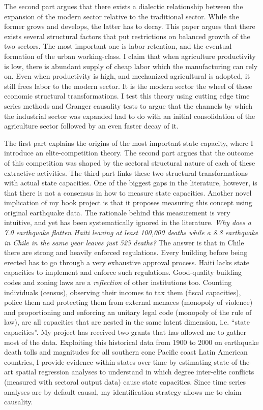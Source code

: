\documentclass[11pt]{letter} %
\begin{document}
\begin{letter}{}
The second part argues that there exists a dialectic relationship between the expansion of the modern sector relative to the traditional sector. While the former grows and develops, the latter has to decay. This paper argues that there exists several structural factors that put restrictions on balanced growth of the two sectors. The most important one is labor retention, and the eventual formation of the urban working-class. I claim that when agriculture productivity is low, there is abundant supply of cheap labor which the manufacturing can rely on. Even when productivity is high, and mechanized agricultural is adopted, it still frees labor to the modern sector. It is the modern sector the wheel of these economic structural transformations. I test this theory using cutting edge time series methods and Granger causality tests to argue that the channels by which the industrial sector was expanded had to do with an initial consolidation of the agriculture sector followed by an even faster decay of it. 


The first part explains the origins of the most important state capacity, where I introduce an elite-competition theory. The second part argues that the outcome of this competition was shaped by the sectoral structural nature of each of these extractive activities. The third part links these two structural transformations with actual state capacities. One of the biggest gaps in the literature, however, is that there is not a consensus in how to measure state capacities. Another novel implication of my book project is that it proposes measuring this concept using original earthquake data. The rationale behind this measurement is very intuitive, and yet has been systematically ignored in the literature. \emph{Why does a 7.0 earthquake flatten Haiti leaving at least 100,000 deaths while a 8.8 earthquake in Chile in the same year leaves just 525 deaths?} The answer is that in Chile there are strong and heavily enforced regulations. Every building before being erected has to go through a very exhaustive approval process. Haiti lacks state capacities to implement and enforce such regulations. Good-quality building codes and zoning laws are a \emph{reflection} of other institutions too. Counting individuals (census), observing their incomes to tax them (fiscal capacities), police them and protecting them from external menaces (monopoly of violence) and proportioning and enforcing an unitary legal code (monopoly of the rule of law), are all capacities that are nested in the same latent dimension, i.e. ``state capacities''. My project has received two grants that has allowed me to gather most of the data. Exploiting this historical data from 1900 to 2000 on earthquake death tolls and magnitudes for all southern cone Pacific coast Latin American countries, I provide evidence within states over time by estimating state-of-the-art spatial regression analyses to understand in which degree inter-elite conflicts (measured with sectoral output data) cause state capacities. Since time series analyses are by default causal, my identification strategy allows me to claim causality. 


\end{letter}
\end{document}
